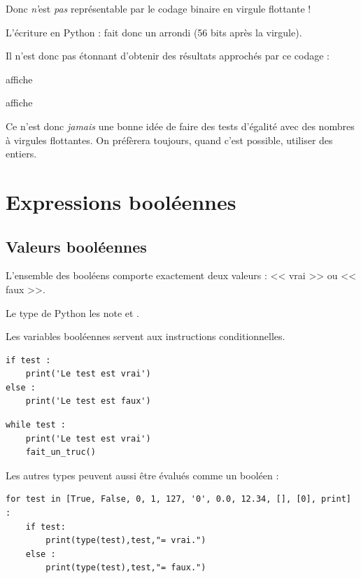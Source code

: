 Donc  \emph{n'}est \emph{pas} représentable par le codage binaire en virgule flottante !

L'écriture en Python :  fait donc un arrondi (56 bits après la virgule).

Il n'est donc pas étonnant d'obtenir des résultats approchés par ce codage :

 affiche 

 affiche 

Ce n'est donc \emph{jamais} une bonne idée de faire des tests d'égalité avec des nombres à virgules flottantes. On préfèrera toujours, quand c'est possible, utiliser des entiers.



\chapter{Expressions booléennes}

\section{Valeurs booléennes}
L'ensemble des booléens comporte exactement deux valeurs : << vrai >> ou << faux >>.

Le type  de Python les note  et .

Les variables booléennes servent aux instructions conditionnelles.

\begin{multicols}{2}
\begin{verbatim}
if test :
    print('Le test est vrai')
else :
    print('Le test est faux')
\end{verbatim}  


\begin{verbatim}
while test :
    print('Le test est vrai')
    fait_un_truc()
\end{verbatim}  
\end{multicols}

Les autres types peuvent aussi être évalués comme un booléen :

\begin{verbatim}
for test in [True, False, 0, 1, 127, '0', 0.0, 12.34, [], [0], print] :
    if test:
        print(type(test),test,"= vrai.")
    else :
        print(type(test),test,"= faux.")
\end{verbatim}

